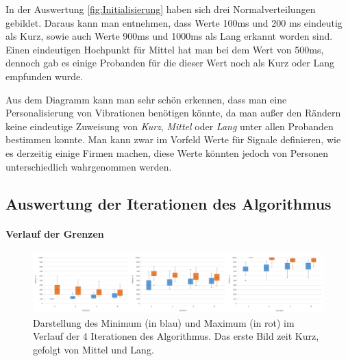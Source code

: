 
In der Auswertung \autoref{fig:Initialisierung} haben sich drei Normalverteilungen gebildet. 
Daraus kann man entnehmen, dass Werte 100ms und  200 ms eindeutig als Kurz, sowie auch Werte 900ms und 1000ms als Lang erkannt worden sind. 
Einen eindeutigen Hochpunkt f{\"u}r Mittel hat man bei dem Wert von 500ms, dennoch gab es einige Probanden f{\"u}r die dieser Wert noch als Kurz oder Lang empfunden wurde. 

Aus dem Diagramm kann man sehr sch{\"o}n erkennen, dass man eine Personalisierung von Vibrationen ben{\"o}tigen k{\"o}nnte, da man au{\ss}er den R{\"a}ndern keine eindeutige Zuweisung von \textit{Kurz}, \textit{Mittel} oder \textit{Lang} unter allen Probanden bestimmen konnte. 
Man kann zwar im Vorfeld Werte f{\"u}r Signale definieren, wie es derzeitig einige Firmen machen, diese Werte k{\"o}nnten jedoch von Personen unterschiedlich wahrgenommen werden.

\subsection{Auswertung der Iterationen des Algorithmus}


\paragraph{Verlauf der Grenzen}

\begin{figure}[htbp] 
	   \centering
   	\includegraphics[width=\textwidth]{pics/analyse/algo/MinMax/MinMaxFinal.png}
	\caption{Darstellung des Minimum (in blau) und Maximum (in rot) im Verlauf der 4 Iterationen des Algorithmus. Das erste Bild zeit Kurz, gefolgt von Mittel und Lang.}
	\label{fig:MinMaxSignale}
\end{figure}

